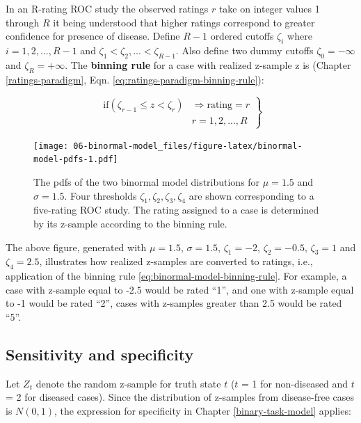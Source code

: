 \documentclass[
]{book}
\begin{document}
In an R-rating ROC study the observed ratings \(r\) take on integer values 1 through \(R\) it being understood that higher ratings correspond to greater confidence for presence of disease. Define \(R-1\) ordered cutoffs \(\zeta_i\) where \(i=1,2,...,R-1\) and \(\zeta_1 < \zeta_2,...< \zeta_{R-1}\). Also define two dummy cutoffs \(\zeta_0 = -\infty\) and \(\zeta_R = +\infty\). The \textbf{binning rule} for a case with realized z-sample z is (Chapter \ref{ratings-paradigm}, Eqn. \eqref{eq:ratings-paradigm-binning-rule}):

\begin{equation}
\left.
\begin{aligned}  
\text{if} \left (\zeta_{r-1} \le z < \zeta_r  \right )&\Rightarrow \text{rating} = r\\
&r = 1, 2, ..., R
\end{aligned}
\right \}
\label{eq:binormal-model-binning-rule}
\end{equation}

\begin{figure}
\centering
\texttt{[image: 06-binormal-model\_files/figure-latex/binormal-model-pdfs-1.pdf]}
\caption{\label{fig:binormal-model-pdfs}The pdfs of the two binormal model distributions for \(\mu = 1.5\) and \(\sigma = 1.5\). Four thresholds \(\zeta_1, \zeta_2, \zeta_3, \zeta_4\) are shown corresponding to a five-rating ROC study. The rating assigned to a case is determined by its z-sample according to the binning rule.}
\end{figure}

The above figure, generated with \(\mu = 1.5\), \(\sigma = 1.5\), \(\zeta_1 = -2\), \(\zeta_2 = -0.5\), \(\zeta_3 = 1\) and \(\zeta_4 = 2.5\), illustrates how realized z-samples are converted to ratings, i.e., application of the binning rule \eqref{eq:binormal-model-binning-rule}. For example, a case with z-sample equal to -2.5 would be rated ``1'', and one with z-sample equal to -1 would be rated ``2'', cases with z-samples greater than 2.5 would be rated ``5''.

\hypertarget{sensitivity-and-specificity-1}{%
\subsection{Sensitivity and specificity}\label{sensitivity-and-specificity-1}}

Let \(Z_t\) denote the random z-sample for truth state \(t\) (\(t\) = 1 for non-diseased and \(t\) = 2 for diseased cases). Since the distribution of z-samples from disease-free cases is \(N(0,1)\), the expression for specificity in Chapter \ref{binary-task-model} applies:
\end{document}
